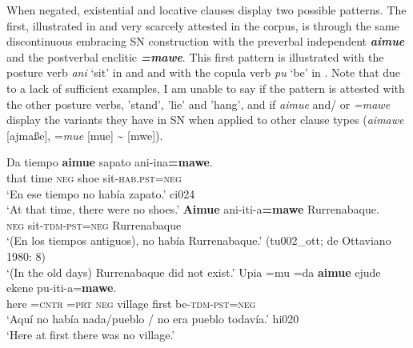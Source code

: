 \documentclass[output=paper]{langsci/langscibook}
\begin{document}
When negated, existential and locative clauses display two possible
patterns. The first, illustrated in  and very
scarcely attested in the corpus, is through the same discontinuous
embracing SN construction with the preverbal independent
\textbf{\textit{aimue}} and the postverbal enclitic
\textbf{\textit{=mawe}}. This first pattern is illustrated with the posture
verb \textit{ani} `sit' in  and
 and with the copula verb \textit{pu}
`be' in . Note that due to a
lack of sufficient examples, I am unable to say if the pattern is attested with the other posture verbs, 'stand', 'lie' and 'hang', and if \textit{aimue} and\slash
or \textit{=mawe} display the variants they have in SN when applied to
other clause types (\textit{aimawe} [ajmaße], =\textit{mue} [mue] 
{\textasciitilde} [mwe]). 

\begin{exe}\ex\label{ex:tacana-oldtimes}\begin{xlist}
\ex\label{ex:tacana-oldtimes-noshoes}
\gll {\ob}Da tiempo{\cb} \textbf{aimue} sapato
ani-ina\textbf{=mawe}.\\
    that  time  \textsc{neg}  shoe  sit-\textsc{hab.pst=neg}\\
\glt `En ese tiempo no había zapato.' ci024\\
`At that time, there were no shoes.'
\ex\label{ex:tacana-oldtimes-Rurrenabaque}
\gll \textbf{Aimue} ani-iti-a\textbf{=mawe} Rurrenabaque.\\
    \textsc{neg}  sit-\textsc{tdm-pst=neg}  Rurrenabaque\\
\glt `(En los tiempos antiguos), no había Rurrenabaque.' (tu002\_ott; de Ottaviano 1980: 8)\\
`(In the old days) Rurrenabaque did not exist.'
\ex\label{ex:tacana-oldtimes-village}
\gll {}Upia  =mu  =da \textbf{aimue} ejude ekene
pu-iti-a=\textbf{mawe}.\\
    here  =\textsc{cntr}  \textsc{=prt}  \textsc{neg}  village  first
    be-\textsc{tdm}-\textsc{pst=neg}\\
\glt `Aquí no había nada/pueblo \slash{}  no era pueblo todavía.' hi020\\
`Here at first there was no village.'
\end{xlist}\end{exe}
\end{document}
